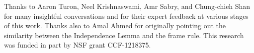 Thanks to Aaron Turon, Neel Krishnaswami, Amr Sabry, and
Chung-chieh Shan for many insightful conversations and for their expert feedback at various stages of this work.
Thanks also to Amal Ahmed for originally pointing out the
similarity between the Independence Lemma and the frame rule.  This
research was funded in part by NSF grant CCF-1218375.

